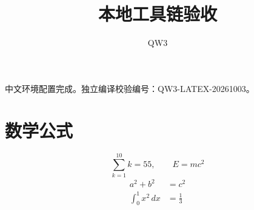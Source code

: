 \documentclass[UTF8,fontset=none]{ctexart}
\title{本地工具链验收}
\author{QW3}
\date{}
\begin{document}
\maketitle
中文环境配置完成。独立编译校验编号：QW3-LATEX-20261003。
\section{数学公式}
\[\sum_{k=1}^{10} k = 55,\qquad E = mc^2\]
\begin{align}a^2+b^2&=c^2\\\int_0^1 x^2\,dx&=\frac{1}{3}\end{align}
\end{document}
